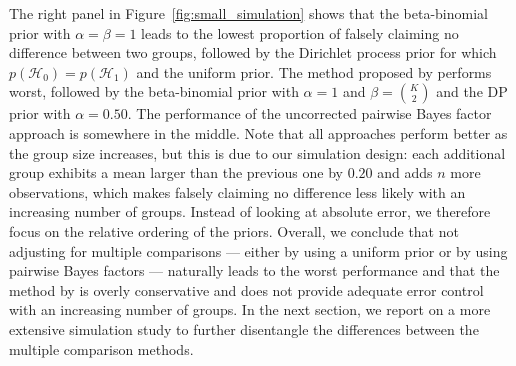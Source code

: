 \documentclass[11pt,a4paper]{article}
\theoremstyle{definition} %
\theoremstyle{case}
\begin{document}
The right panel in Figure~\ref{fig:small_simulation} shows that the beta-binomial prior with $\alpha = \beta = 1$ leads to the lowest proportion of falsely claiming no difference between two groups, followed by the Dirichlet process prior for which $p(\mathcal{H}_0) = p(\mathcal{H}_1)$ and the uniform prior. The method proposed by \textcite{westfall1997bayesian} performs worst, followed by the beta-binomial prior with $\alpha = 1$ and $\beta = {K \choose 2}$ and the DP prior with $\alpha = 0.50$. The performance of the uncorrected pairwise Bayes factor approach is somewhere in the middle. Note that all approaches perform better as the group size increases, but this is due to our simulation design: each additional group exhibits a mean larger than the previous one by $0.20$ and adds $n$ more observations, which makes falsely claiming no difference less likely with an increasing number of groups. Instead of looking at absolute error, we therefore focus on the relative ordering of the priors. Overall, we conclude that not adjusting for multiple comparisons — either by using a uniform prior or by using pairwise Bayes factors — naturally leads to the worst performance and that the method by \textcite{westfall1997bayesian} is overly conservative and does not provide adequate error control with an increasing number of groups. In the next section, we report on a more extensive simulation study to further disentangle the differences between the multiple comparison methods.


\end{document}

